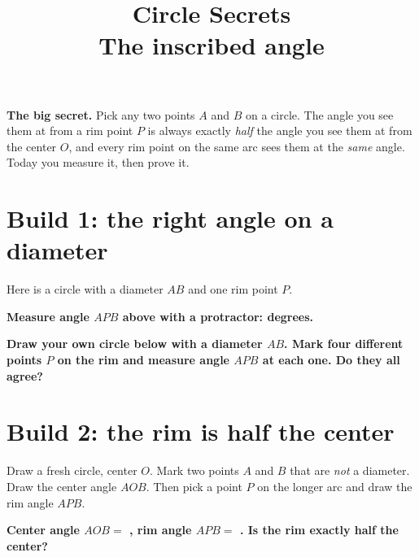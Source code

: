 \documentclass[11pt]{article}
\title{\vspace{-1.5cm}\textbf{Circle Secrets}\\[-2pt]
  \large The inscribed angle}
\author{}
\date{}
\newcommand{\drawbox}[1]{%
  \par\vspace{4pt}\noindent
  \fbox{\rule{0pt}{#1}\rule{\dimexpr\linewidth-2\fboxsep-2\fboxrule}{0pt}}%
  \par\vspace{6pt}}
\newcommand{\task}[1]{\par\medskip\noindent\textbf{\color{benblue}#1}\par\nopagebreak}
\begin{document}
\maketitle
\vspace{-1.2cm}

\noindent\textbf{The big secret.} Pick any two points $A$ and $B$ on a circle.
The angle you see them at from a rim point $P$ is always exactly \emph{half} the
angle you see them at from the center $O$, and every rim point on the same arc
sees them at the \emph{same} angle. Today you measure it, then prove it.

\section*{Build 1: the right angle on a diameter}
Here is a circle with a diameter $AB$ and one rim point $P$.

\begin{center}
\end{center}

\task{Measure angle $APB$ above with a protractor: \underline{\hspace{2cm}} degrees.}
\task{Draw your own circle below with a diameter $AB$. Mark four different points
$P$ on the rim and measure angle $APB$ at each one. Do they all agree?}
\drawbox{3cm}

\section*{Build 2: the rim is half the center}
Draw a fresh circle, center $O$. Mark two points $A$ and $B$ that are \emph{not}
a diameter. Draw the center angle $AOB$. Then pick a point $P$ on the longer arc
and draw the rim angle $APB$.

\task{Center angle $AOB =$ \underline{\hspace{1.6cm}}, \quad rim angle
$APB =$ \underline{\hspace{1.6cm}}. \quad Is the rim exactly half the center?}
\drawbox{3cm}
\end{document}
